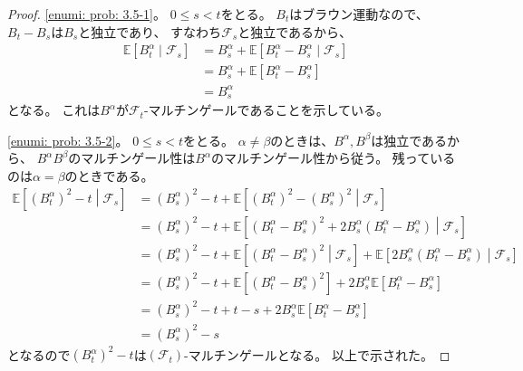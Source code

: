 \documentclass[uplatex]{jsarticle}
\theoremstyle{definition}
\def\E{\mathbb{E}}
\def\mcF{\mathcal{F}}
\begin{document}
\begin{proof}
  \ref{enumi: prob: 3.5-1}。
  \(0\leq s < t\)をとる。
  \(B_t\)はブラウン運動なので、\(B_t-B_s\)は\(B_s\)と独立であり、
  すなわち\(\mcF_s\)と独立であるから、
  \begin{align*}
    \E\left[ B_t^{\alpha}\middle| \mcF_s \right]
    &= B_s^{\alpha} + \E\left[ B_t^{\alpha}-B_s^{\alpha}\middle| \mcF_s \right] \\
    &= B_s^{\alpha} + \E\left[ B_t^{\alpha}-B_s^{\alpha}\right] \\
    &= B_s^{\alpha}
  \end{align*}
  となる。
  これは\(B^\alpha\)が\(\mcF_t\)-マルチンゲールであることを示している。

  \ref{enumi: prob: 3.5-2}。
  \(0\leq s < t\)をとる。
  \(\alpha\neq \beta\)のときは、\(B^\alpha,B^\beta\)は独立であるから、
  \(B^\alpha B^\beta\)のマルチンゲール性は\(B^\alpha\)のマルチンゲール性から従う。
  残っているのは\(\alpha = \beta\)のときである。
  \begin{align*}
    \E\left[ (B_t^{\alpha})^2-t \middle| \mcF_s \right]
    &= (B_s^{\alpha})^2 - t
    + \E\left[ (B_t^{\alpha})^2 - (B_s^{\alpha})^2 \middle| \mcF_s \right] \\
    &= (B_s^{\alpha})^2 - t
    + \E\left[ (B_t^\alpha-B_s^\alpha)^2
    + 2B_s^\alpha (B_t^\alpha-B_s^\alpha) \middle| \mcF_s \right] \\
    &= (B_s^{\alpha})^2 - t
    + \E\left[ (B_t^\alpha-B_s^\alpha)^2 \middle| \mcF_s \right]
    + \E\left[ 2B_s^\alpha (B_t^\alpha-B_s^\alpha) \middle| \mcF_s \right] \\
    &= (B_s^{\alpha})^2 - t
    + \E\left[ (B_t^\alpha-B_s^\alpha)^2 \right]
    + 2B_s^\alpha \E\left[ B_t^\alpha-B_s^\alpha \right] \\
    &= (B_s^{\alpha})^2 - t + t - s
    + 2B_s^\alpha \E\left[ B_t^\alpha-B_s^\alpha \right] \\
    &= (B_s^{\alpha})^2 - s
  \end{align*}
  となるので\((B_t^\alpha)^2-t\)は\((\mcF_t)\)-マルチンゲールとなる。
  以上で示された。
\end{proof}
\end{document}
